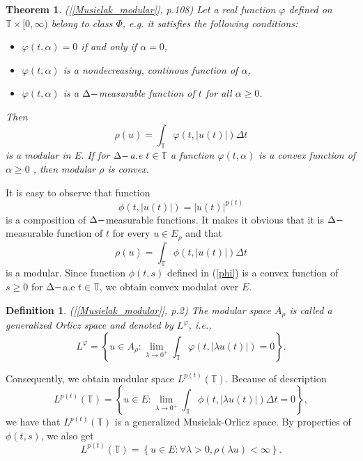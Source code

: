 \documentclass[12pt,a4paper,oneside,titlepage]{article}
\newtheorem{Twierdzenie}{Theorem}
\newtheorem{Def}{Definition}
\begin{document}
\begin{Twierdzenie} ([\ref{Musielak_modular}], p.108)
\label{klasa_fi}
Let a real function $\varphi$ defined on $\mathbb{T}\times [0, \infty)$ belong to class $\Phi$, e.g. it satisfies the following conditions:
\begin{itemize}
\item[($\Phi$1)] $\varphi (t,\alpha)=0$ if and only if $\alpha=0$,
\item[($\Phi$2)] $\varphi (t,\alpha)$ is a nondecreasing, continous function of $\alpha$, 
\item[($\Phi$3)]$\varphi (t,\alpha)$ is a $\Delta \-- $measurable function of $t$ for all $\alpha \geq 0$. 
\end{itemize}
Then
\begin{equation}
\rho(u) = \int_{\mathbb{T}} \varphi(t,\vert u(t) \vert ) \Delta t
\end{equation}
is a modular in E. If for $\Delta \-- $a.e $t \in \mathbb{T}$ a function $\varphi(t,\alpha)$ is a convex function of $\alpha \geq 0$ , then modular $\rho$ is convex.
\end{Twierdzenie}
It is easy to observe that function 
\begin{equation}
\nonumber
\phi(t, \vert u(t) \vert)= \vert u(t) \vert^{p(t)}
\end{equation}
is a composition of $\Delta \-- $measurable functions. It makes it obvious that it is $\Delta \-- $measurable function of $t$ for every $u \in E_{\rho}$ and that
\begin{equation}
\rho(u) = \int_{\mathbb{T}} \phi (t, \vert u(t) \vert) \Delta t 
\end{equation}
is a modular. Since function $\phi(t,s)$ defined in (\ref{phi}) is a convex function of $s \geq 0$ for $\Delta \-- $a.e $t \in \mathbb{T}$, we obtain convex modulat over $E$.
\begin{Def} ([\ref{Musielak_modular}], p.2) The modular space $A_{\rho}$ is called a generalized Orlicz space and denoted by $L^{\varphi}$, i.e.,
\begin{equation}
L^{\varphi} = \left\lbrace u \in A_{\rho} :
\lim_{\lambda \rightarrow 0^{+}} \int_{\mathbb{T}} \varphi (t,  \vert \lambda u(t) \vert )=0  \right\rbrace.
\end{equation}

\end{Def}


Consequently, we obtain modular space $L^{p(t)}(\mathbb{T})$. Because of description
\begin{equation}
L^{p(t)}(\mathbb{T}) = \left\lbrace u \in E :  \lim_{\lambda \rightarrow 0^{+}}     \int_{\mathbb{T}}\phi(t, \vert \lambda u(t) \vert) \Delta t = 0   \right\rbrace,
\end{equation}
we have that $L^{p(t)}(\mathbb{T})$ is a generalized Musielak-Orlicz space.
By properties of $\phi(t,s)$, we also get
\begin{equation}
\label{another_int}
L^{p(t)}(\mathbb{T}) = \left\lbrace u \in E: \forall \lambda>0, \rho(\lambda u ) < \infty \right\rbrace.
\end{equation}
\end{document}
